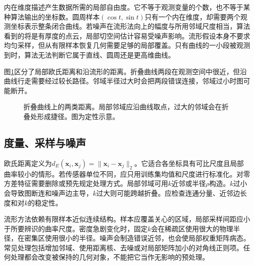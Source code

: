 内在维度描述产生数据所需的局部自由度。它不等于观测变量的个数，也不等于某种算法输出的坐标数。圆周样本$(\cos t,\sin t)$只有一个内在维度，却需要两个观测坐标表示整条闭合曲线。若噪声在流形法向上的幅度与所用邻域尺度相当，算法看到的将是有厚度的点云，局部切空间估计容易受噪声影响。流形假设本身不要求均匀采样，但从有限样本恢复几何需要足够的局部覆盖。只有曲线的一小段被观测到时，算法无法判断它属于直线、圆周还是更高维曲线。

图\ref{fig:manifold-folded-neighborhood}区分了局部欧氏距离和沿流形的距离。折叠曲线两段在观测空间中很近，但沿曲线行走需要经过较长路径。邻域半径过大时会把两段错误连接，邻域过小时图可能断开。
\begin{figure}[htbp]
\centering
{}
\caption{折叠曲线上的两类距离。局部邻域应沿曲线取点，过大的邻域会在折叠处形成捷径。图为定性示意。}
\label{fig:manifold-folded-neighborhood}
\end{figure}

\subsection{度量、采样与噪声}
欧氏距离定义为$d_E(\bm x_i,\bm x_j)=\|\bm x_i-\bm x_j\|_2$。它适合各坐标具有可比尺度且局部曲率较小的情形。若传感器单位不同，应只用训练集均值和尺度进行标准化。对零方差特征需要删除或预先规定处理方式。局部邻域可用$k$近邻或半径$\rho$构造。$k$过小会导致图断连和噪声边主导，$k$过大则可能跨越折叠。应检查连通分量、近邻边长度和对$k$的稳定性。

流形方法依赖有限样本近似连续结构。样本应覆盖关心的区域，局部采样间距应小于所要辨识的曲率尺度。密度急剧变化时，固定$k$会在稀疏区使用很大的物理半径，在密集区使用很小的半径。噪声会制造错误近邻，也会使局部权重矩阵病态。常见处理包括增加邻域、使用距离核、去噪或对局部矩阵加小的对角线正则项。任何处理都会改变被保持的几何对象，不能把它当作无影响的预处理。


